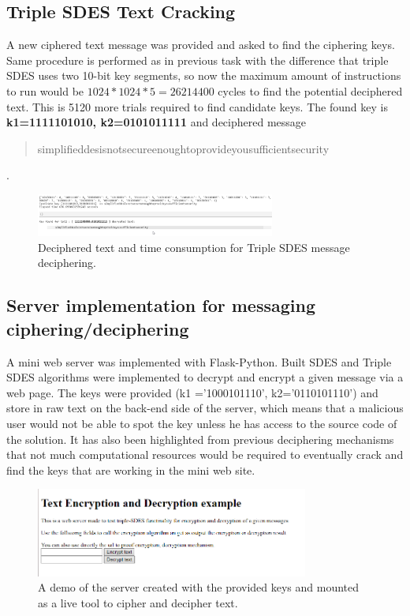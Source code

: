 \documentclass[letterpaper,12pt]{article}
\begin{document}
\subsection{Triple SDES Text Cracking}
A new ciphered text message was provided and asked to find the ciphering keys. Same procedure is performed as in previous task with the difference that triple SDES uses two 10-bit key segments, so now the maximum amount of instructions to run would be $1024*1024*5=26214400$ cycles to find the potential deciphered text. This is 5120 more trials required to find candidate keys. The found key is  \textbf{k1=1111101010, k2=0101011111} and deciphered message \begin{quote}simplifieddesisnotsecureenoughtoprovideyousufficientsecurity\end{quote}. 

\begin{figure}[H]
    \centering
    \includegraphics[width=0.7\textwidth]{assets/3SDESCrack.png}
    \caption{Deciphered text and time consumption for Triple SDES message deciphering.}
\end{figure}


\subsection{Server implementation for messaging ciphering/deciphering}
A mini web server was implemented with Flask-Python. Built SDES and Triple SDES algorithms were implemented to decrypt and encrypt a given message via a web page. The keys were provided (k1 ='1000101110', k2='0110101110') and store in raw text on the back-end side of the server, which means that a malicious user would not be able to spot the key unless he has access to the source code  of the solution. It has also been highlighted from previous deciphering mechanisms that not much computational resources would be required to eventually crack and find the keys that are working in the mini web site.

\begin{figure}
    \centering
    \includegraphics[width=0.8\textwidth]{assets/ServerIndex.png}
    \caption{A demo of the server created with the provided keys and mounted as a live tool to cipher and decipher text. }
    \label{fig:my_label}
\end{figure}
\end{document}
